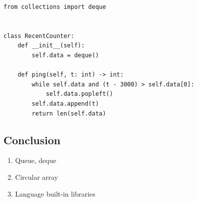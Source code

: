 \documentclass[aspectratio=169, 14pt]{beamer}
\begin{document}
\begin{frame}[fragile]

	\begin{verbatim}
from collections import deque


class RecentCounter:
    def __init__(self):
        self.data = deque()

    def ping(self, t: int) -> int:
        while self.data and (t - 3000) > self.data[0]:
            self.data.popleft()
        self.data.append(t)
        return len(self.data)
        \end{verbatim}

\end{frame}

\begin{frame}
	\section{\textcolor{darkmidnightblue}{Conclusion}}
	\begin{enumerate}
		\item Queue, deque
		\item Circular array
		\item Language built-in libraries
	\end{enumerate}
\end{frame}
\end{document}
